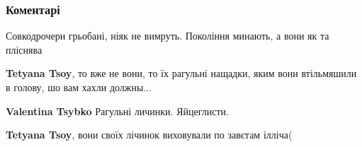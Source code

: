  
 
 
 
 
\subsubsection{Коментарі}
\label{sec:17_08_2021.fb.birjukov_jurij.1.vystavka_alleja.cmt}

\begin{itemize}
 
Совкодрочери грьобані, ніяк не вимруть. Покоління минають, а вони як та пліснява

\begin{itemize}
 
\textbf{Tetyana Tsoy}, то вже не вони, то їх рагульні нащадки, яким вони втільмяшили в голову, шо вам хахли должны...

 
\textbf{Valentina Tsybko}
Рагульні личинки. Яйцеглисти.

 
\textbf{Tetyana Tsoy}, вони своїх лічинок виховували по завєтам ілліча(

 

\end{itemize}
\end{itemize}
